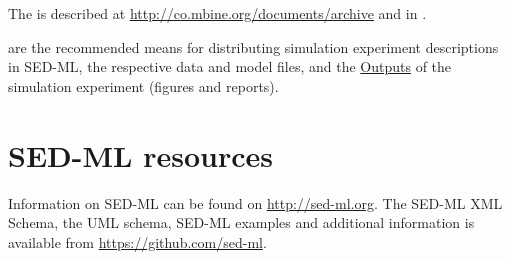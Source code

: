 The  is described at \url{http://co.mbine.org/documents/archive} and 
in \citep{Bergmann2014}.

 are the recommended means for distributing simulation experiment descriptions in SED-ML, the respective data and model files, and the \hyperref[class:output]{Outputs} of the simulation experiment (figures and reports).

\section{SED-ML resources}
\label{sec:resources}

Information on SED-ML can be found on \url{http://sed-ml.org}. The SED-ML XML Schema, the UML schema, SED-ML examples and additional information is available from \url{https://github.com/sed-ml}.
